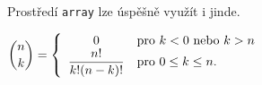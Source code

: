 \documentclass[a4paper, 11pt, twocolumn] {article}
\theoremstyle{definition}
\theoremstyle{plain}
\begin{document}
Prostředí \texttt{array} lze úspěšně využít i jinde.\\
\begin{center}
$\displaystyle\binom{n}{k} = \left\{ \begin{array}{c l}0 & \mbox{pro $k < 0$ nebo $k > n$}\\
        		\displaystyle\frac{n!}{k!(n-k)!} & \mbox{pro $0 \leq k \leq n$}.
    			\end{array} 
    			\right.$
\end{center}
\end{document}
